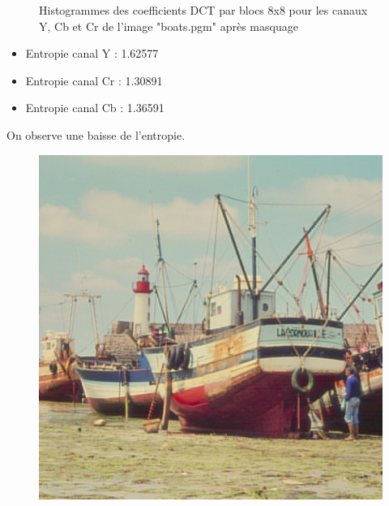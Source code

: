 \documentclass[12pt]{report}
\begin{document}
\begin{figure}[H]
\begin{center}
\caption{Histogrammes des coefficients DCT par blocs 8x8 pour les canaux Y, Cb et Cr de l'image "boats.pgm" après masquage}
\end{center}
\end{figure}

\begin{itemize}
\item Entropie canal Y : 1.62577
\item Entropie canal Cr : 1.30891
\item Entropie canal Cb : 1.36591\\
\end{itemize}

On observe une baisse de l'entropie.

\begin{figure}[H]
\begin{center}
\includegraphics[scale=0.4]{../ImageRes/blockidct_masked_result.jpg} 

\end{center}
\end{figure}
\end{document}
